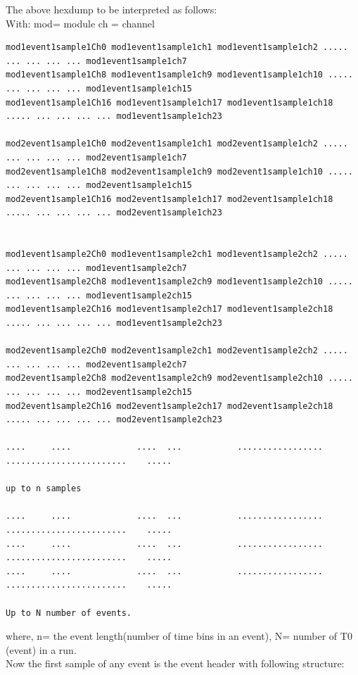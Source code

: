 \documentclass[12pt]{article}
\begin{document}
The above hexdump to be interpreted as follows:\\
With: mod= module  ch = channel\\
\begingroup
    \fontsize{8pt}{12pt}\selectfont
    \begin{verbatim}      
mod1event1sample1Ch0 mod1event1sample1ch1 mod1event1sample1ch2 ..... ... ... ... ... mod1event1sample1ch7 
mod1event1sample1Ch8 mod1event1sample1ch9 mod1event1sample1ch10 ..... ... ... ... ... mod1event1sample1ch15
mod1event1sample1Ch16 mod1event1sample1ch17 mod1event1sample1ch18 ..... ... ... ... ... mod1event1sample1ch23

mod2event1sample1Ch0 mod2event1sample1ch1 mod2event1sample1ch2 ..... ... ... ... ... mod2event1sample1ch7 
mod2event1sample1Ch8 mod2event1sample1ch9 mod2event1sample1ch10 ..... ... ... ... ... mod2event1sample1ch15
mod2event1sample1Ch16 mod2event1sample1ch17 mod2event1sample1ch18 ..... ... ... ... ... mod2event1sample1ch23


mod1event1sample2Ch0 mod1event1sample2ch1 mod1event1sample2ch2 ..... ... ... ... ... mod1event1sample2ch7 
mod1event1sample2Ch8 mod1event1sample2ch9 mod1event1sample2ch10 ..... ... ... ... ... mod1event1sample2ch15
mod1event1sample2Ch16 mod1event1sample2ch17 mod1event1sample2ch18 ..... ... ... ... ... mod1event1sample2ch23

mod2event1sample2Ch0 mod2event1sample2ch1 mod2event1sample2ch2 ..... ... ... ... ... mod2event1sample2ch7
mod2event1sample2Ch8 mod2event1sample2ch9 mod2event1sample2ch10 ..... ... ... ... ... mod2event1sample2ch15
mod2event1sample2Ch16 mod2event1sample2ch17 mod2event1sample2ch18 ..... ... ... ... ... mod2event1sample2ch23
  
....     ....             ....  ...           .................             ........................    .....

up to n samples

....     ....             ....  ...           .................             ........................    .....
....     ....             ....  ...           .................             ........................    .....
....     ....             ....  ...           .................             ........................    .....

Up to N number of events.
\end{verbatim}    
\endgroup
where, n= the event length(number of time bins in an event), N= number of T0 (event) in a run. \\
Now the first sample of any event is the event header with following structure:\\
\end{document}
